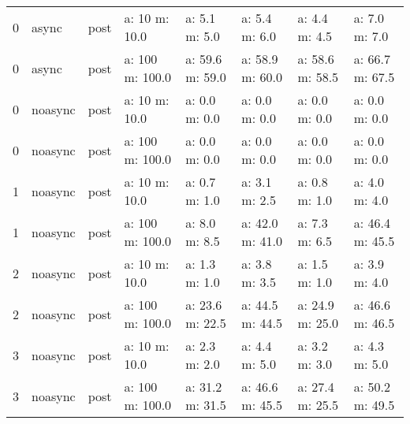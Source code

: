 \documentclass[a4paper]{report}
\begin{document}
\begin{table}[]
\begin{tabular}{l l l l|l l l l}
		0         & async   & post                            & a: 10 m: 10.0     & a: 5.1 m: 5.0   & a: 5.4 m: 6.0   & a: 4.4 m: 4.5   & a: 7.0 m: 7.0   \\
		0         & async   & post                            & a: 100 m: 100.0   & a: 59.6 m: 59.0 & a: 58.9 m: 60.0 & a: 58.6 m: 58.5 & a: 66.7 m: 67.5 \\
		0         & noasync & post                            & a: 10 m: 10.0     & a: 0.0 m: 0.0   & a: 0.0 m: 0.0   & a: 0.0 m: 0.0   & a: 0.0 m: 0.0   \\
		0         & noasync & post                            & a: 100 m: 100.0   & a: 0.0 m: 0.0   & a: 0.0 m: 0.0   & a: 0.0 m: 0.0   & a: 0.0 m: 0.0   \\
		1         & noasync & post                            & a: 10 m: 10.0     & a: 0.7 m: 1.0   & a: 3.1 m: 2.5   & a: 0.8 m: 1.0   & a: 4.0 m: 4.0   \\
		1         & noasync & post                            & a: 100 m: 100.0   & a: 8.0 m: 8.5   & a: 42.0 m: 41.0 & a: 7.3 m: 6.5   & a: 46.4 m: 45.5 \\
		2         & noasync & post                            & a: 10 m: 10.0     & a: 1.3 m: 1.0   & a: 3.8 m: 3.5   & a: 1.5 m: 1.0   & a: 3.9 m: 4.0   \\
		2         & noasync & post                            & a: 100 m: 100.0   & a: 23.6 m: 22.5 & a: 44.5 m: 44.5 & a: 24.9 m: 25.0 & a: 46.6 m: 46.5 \\
		3         & noasync & post                            & a: 10 m: 10.0     & a: 2.3 m: 2.0   & a: 4.4 m: 5.0   & a: 3.2 m: 3.0   & a: 4.3 m: 5.0   \\
		3         & noasync & post                            & a: 100 m: 100.0   & a: 31.2 m: 31.5 & a: 46.6 m: 45.5 & a: 27.4 m: 25.5 & a: 50.2 m: 49.5 \\
	\end{tabular}
\end{table}
\end{document}
